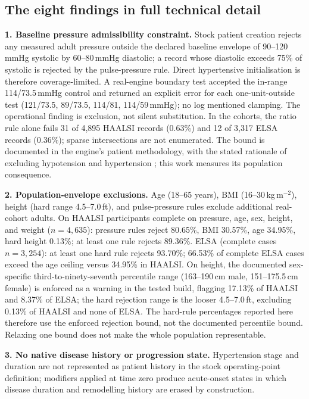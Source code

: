 \documentclass[preprint,12pt,nopreprintline]{elsarticle}
\begin{document}
\subsection{The eight findings in full technical detail}

\textbf{1. Baseline pressure admissibility constraint.} Stock patient creation rejects any measured adult pressure outside the declared baseline envelope of 90--120\,mmHg systolic by 60--80\,mmHg diastolic; a record whose diastolic exceeds 75\% of systolic is rejected by the pulse-pressure rule. Direct hypertensive initialisation is therefore coverage-limited. A real-engine boundary test accepted the in-range 114/73.5\,mmHg control and returned an explicit error for each one-unit-outside test (121/73.5, 89/73.5, 114/81, 114/59\,mmHg); no log mentioned clamping. The operational finding is exclusion, not silent substitution. In the cohorts, the ratio rule alone fails 31 of 4{,}895 HAALSI records (0.63\%) and 12 of 3{,}317 ELSA records (0.36\%); sparse intersections are not enumerated. The bound is documented in the engine's patient methodology, with the stated rationale of excluding hypotension and hypertension \cite{pulsepatient}; this work measures its population consequence.

\textbf{2. Population-envelope exclusions.} Age (18--65 years), BMI (16--30\,kg\,m$^{-2}$), height (hard range 4.5--7.0\,ft), and pulse-pressure rules exclude additional real-cohort adults. On HAALSI participants complete on pressure, age, sex, height, and weight ($n=4{,}635$): pressure rules reject 80.65\%, BMI 30.57\%, age 34.95\%, hard height 0.13\%; at least one rule rejects 89.36\%. ELSA (complete cases $n=3{,}254$): at least one hard rule rejects 93.70\%; 66.53\% of complete ELSA cases exceed the age ceiling versus 34.95\% in HAALSI. On height, the documented sex-specific third-to-ninety-seventh percentile range (163--190\,cm male, 151--175.5\,cm female) is enforced as a warning in the tested build, flagging 17.13\% of HAALSI and 8.37\% of ELSA; the hard rejection range is the looser 4.5--7.0\,ft, excluding 0.13\% of HAALSI and none of ELSA. The hard-rule percentages reported here therefore use the enforced rejection bound, not the documented percentile bound. Relaxing one bound does not make the whole population representable.

\textbf{3. No native disease history or progression state.} Hypertension stage and duration are not represented as patient history in the stock operating-point definition; modifiers applied at time zero produce acute-onset states in which disease duration and remodelling history are erased by construction.
\end{document}
